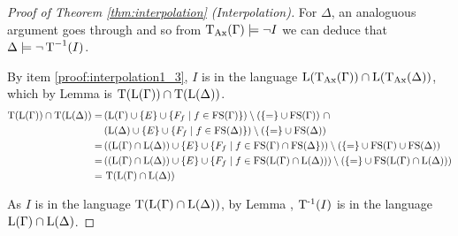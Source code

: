 \begin{proof}[Proof of Theorem \ref{thm:interpolation} (Interpolation)]
	For $\Delta$, an analoguous argument goes through and so from $\operatorname{\operatorname{T}_{Ax}}(\Gamma) \models \lnot I$ we can deduce that $\Delta \models \lnot \operatorname{T}^{-1}(I)$.

	By item \ref{proof:interpolation1_3}, $I$ is in the language $\operatorname{L}(\operatorname{\operatorname{T}_{Ax}}(\Gamma)) \cap \operatorname{L}(\operatorname{\operatorname{T}_{Ax}}(\Delta))$, which by Lemma  is $\Trans(\Lang(\Gamma)) \cap\nolinebreak \Trans(\Lang(\Delta)) $. 
	\begin{align*}
		\Trans(\Lang(\Gamma)) \cap\nolinebreak \Trans(\Lang(\Delta)) =\,&
		(\Lang(\Gamma)\cup \{E\}\cup\{F_f\mid f \in \FS(\Gamma)\}) \setminus(\{=\nolinebreak \} \cup\nolinebreak \FS(\Gamma))~\cap \\
		& (\Lang(\Delta)\cup \{E\}\cup\{F_f\mid f \in \FS(\Delta)\}) \setminus(\{=\nolinebreak \} \cup\nolinebreak \FS(\Delta))\\
		=\,& ((\Lang(\Gamma) \cap \Lang(\Delta)) \cup \{E\} \cup\{F_f\mid f \in \FS(\Gamma)\cap\FS(\Delta\}))  \setminus(\{=\} \cup \FS(\Gamma) \cup \FS(\Delta)) \\
		=\,& ((\Lang(\Gamma) \cap \Lang(\Delta)) \cup \{E\} \cup \{F_f\mid f\in \FS( \Lang(\Gamma) \cap \Lang(\Delta)) ) \setminus ( \{=\} \cup \FS(\Lang(\Gamma) \cap \Lang(\Delta)) )  \\ 
		=\,& \Trans(\Lang(\Gamma) \cap \Lang(\Delta))
	\end{align*}

	As $I$ is in the language $\operatorname{T}(\operatorname{L}(\Gamma) \cap \operatorname{L}(\Delta))$, by Lemma , $\operatorname{T^{-1}}(I)$ is in the language $\operatorname{L}(\Gamma) \cap \operatorname{L}(\Delta)$.
\end{proof}


